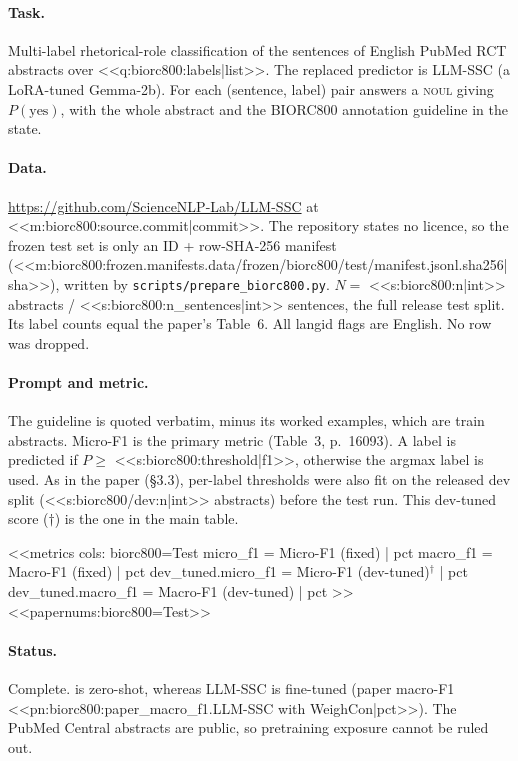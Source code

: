 \paragraph{Task.} Multi-label rhetorical-role classification of the sentences of English PubMed RCT abstracts over
<<q:biorc800:labels|list>>. The replaced predictor is LLM-SSC (a LoRA-tuned Gemma-2b). For each (sentence, label)
pair \jev{} answers a \textsc{noul} giving $P(\text{yes})$, with the whole abstract and the BIORC800 annotation
guideline in the state.

\paragraph{Data.} \url{https://github.com/ScienceNLP-Lab/LLM-SSC} at <<m:biorc800:source.commit|commit>>. The repository
states no licence, so the frozen test set is only an ID + row-SHA-256 manifest
(<<m:biorc800:frozen.manifests.data/frozen/biorc800/test/manifest.jsonl.sha256|sha>>), written by
\texttt{scripts/prepare\_biorc800.py}. $N=$ <<s:biorc800:n|int>> abstracts / <<s:biorc800:n_sentences|int>>
sentences, the full release test split. Its label counts equal the paper's Table~6. All langid flags are English.
No row was dropped.

\paragraph{Prompt and metric.} The guideline is quoted verbatim, minus its worked examples, which are train
abstracts. Micro-F1 is the primary metric (Table~3, p.~16093). A label is predicted if $P\geq$
<<s:biorc800:threshold|f1>>, otherwise the argmax label is used. As in the paper (\S3.3), per-label thresholds were
also fit on the released dev split (<<s:biorc800/dev:n|int>> abstracts) before the test run. This dev-tuned score
($\dagger$) is the one in the main table.

<<metrics
cols: biorc800=Test
micro_f1 = Micro-F1 (fixed) | pct
macro_f1 = Macro-F1 (fixed) | pct
dev_tuned.micro_f1 = Micro-F1 (dev-tuned)$^\dagger$ | pct
dev_tuned.macro_f1 = Macro-F1 (dev-tuned) | pct
>>
<<papernums:biorc800=Test>>

\paragraph{Status.} Complete. \jev{} is zero-shot, whereas LLM-SSC is fine-tuned (paper macro-F1
<<pn:biorc800:paper_macro_f1.LLM-SSC with WeighCon|pct>>). The PubMed Central abstracts are public, so pretraining
exposure cannot be ruled out.
